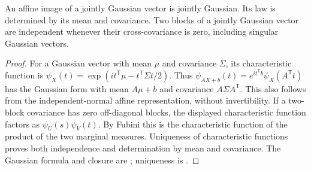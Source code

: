 \begin{proposition}
\label{pf:gaussian}
An affine image of a jointly Gaussian vector is jointly Gaussian. Its law
is determined by its mean and covariance. Two blocks of a jointly Gaussian
vector are independent whenever their cross-covariance is zero, including
singular Gaussian vectors.
\end{proposition}
\begin{proof}
For a Gaussian vector with mean \(\mu\) and covariance \(\Sigma\), its
characteristic function is
\(\psi_X(t)=\exp(i t^{\mathsf T}\mu-t^{\mathsf T}\Sigma t/2)\).
Thus \(\psi_{AX+b}(t)=e^{it^{\mathsf T}b}\psi_X(A^{\mathsf T}t)\)
has the Gaussian form with mean \(A\mu+b\) and covariance
\(A\Sigma A^{\mathsf T}\). This also follows from the independent-normal
affine representation, without invertibility. If a two-block covariance
has zero off-diagonal blocks, the displayed characteristic function
factors as \(\psi_U(s)\psi_V(t)\). By Fubini this is the characteristic
function of the product of the two marginal measures. Uniqueness of
characteristic functions proves both independence and determination by
mean and covariance. The Gaussian formula and closure are
\citet[Theorems 3.3.1--3.3.2, equations (3.14) and (3.18)]{gallager2013};
uniqueness is \citet[Theorem 3.10.4]{durrett2019}.
\end{proof}

